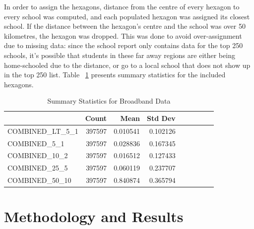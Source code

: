 \documentclass[stu, floatsintext]{apa7}
\begin{document}
    In order to assign the hexagons, distance from the centre of every hexagon to every school was computed, and each populated hexagon was assigned its closest school. If the distance between the hexagon's centre and the school was over 50 kilometres, the hexagon was dropped. This was done to avoid over-assignment due to missing data: since the school report only contains data for the top 250 schools, it's possible that students in these far away regions are either being home-schooled due to the distance, or go to a local school that does not show up in the top 250 list. Table ~\ref{tab:bandwidthSummary} presents summary statistics for the included hexagons. \\

\begin{table}[]
    \caption{Summary Statistics for Broadband Data}
    \label{tab:bandwidthSummary}
    \centering
    \begin{adjustbox}{max width=\textwidth}
        \begin{tabular}{lrrrrrrrr}
            \hline
            & Count   & Mean   & Std Dev \\
            \hline
            COMBINED\_LT\_5\_1      & 397597 & 0.010541 & 0.102126  \\
            COMBINED\_5\_1          & 397597 & 0.028836  & 0.167345  \\
            COMBINED\_10\_2         & 397597 & 0.016512 & 0.127433  \\
            COMBINED\_25\_5         & 397597 & 0.060119	  & 0.237707   \\
            COMBINED\_50\_10        & 397597 & 0.840874 & 0.365794   \\
            \hline
        \end{tabular}%
    \end{adjustbox}
\end{table}
    \section{Methodology and Results}
\end{document}
